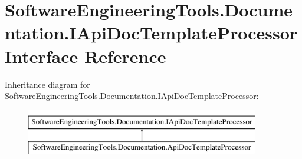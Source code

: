 \hypertarget{interface_software_engineering_tools_1_1_documentation_1_1_i_api_doc_template_processor}{\section{Software\+Engineering\+Tools.\+Documentation.\+I\+Api\+Doc\+Template\+Processor Interface Reference}
\label{interface_software_engineering_tools_1_1_documentation_1_1_i_api_doc_template_processor}
}
Inheritance diagram for Software\+Engineering\+Tools.\+Documentation.\+I\+Api\+Doc\+Template\+Processor\+:\begin{figure}[H]
\begin{center}
\leavevmode
\includegraphics[height=2.000000cm]{interface_software_engineering_tools_1_1_documentation_1_1_i_api_doc_template_processor}
\end{center}
\end{figure}
